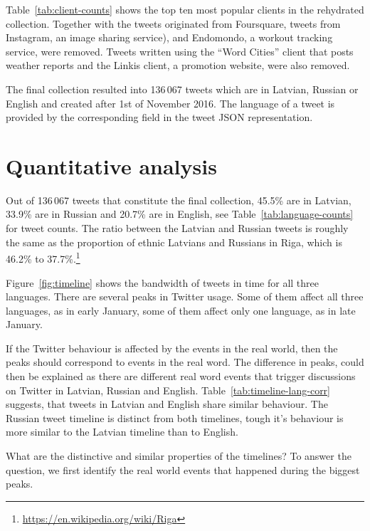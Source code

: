 \documentclass[11pt,a4paper]{article}
\begin{document}
Table~\ref{tab:client-counts} shows the top ten most popular clients in the rehydrated collection. Together with the tweets originated from Foursquare, tweets from Instagram, an image sharing service), and Endomondo, a workout tracking service, were removed. Tweets written using the ``Word Cities'' client that posts weather reports and the Linkis client, a promotion website, were also removed.

The final collection resulted into 136\,067 tweets which are in Latvian, Russian or English and created after 1st of November 2016. The language of a tweet is provided by the corresponding field in the tweet JSON representation.



\section{Quantitative analysis}
\label{sec:quantitative}

Out of 136\,067 tweets that constitute the final collection, 45.5\% are in Latvian, 33.9\% are in Russian and 20.7\% are in English, see Table~\ref{tab:language-counts} for tweet counts. The ratio between the Latvian and Russian tweets is roughly the same as the proportion of ethnic Latvians and Russians in Riga, which is 46.2\% to 37.7\%.\footnote{\url{https://en.wikipedia.org/wiki/Riga}}



Figure~\ref{fig:timeline} shows the bandwidth of tweets in time for all three languages. There are several peaks in Twitter usage. Some of them affect all three languages, as in early January, some of them affect only one language, as in late January.

If the Twitter behaviour is affected by the events in the real world, then the peaks should correspond to events in the real word. The difference in peaks, could then be explained as there are different real word events that trigger discussions on Twitter in Latvian, Russian and English. Table~\ref{tab:timeline-lang-corr} suggests, that tweets in Latvian and English share similar behaviour. The Russian tweet timeline is distinct from both timelines, tough it's behaviour is more similar to the Latvian timeline than to English.



What are the distinctive and similar properties of the timelines? To answer the question, we first identify the real world events that happened during the biggest peaks.
\end{document}
